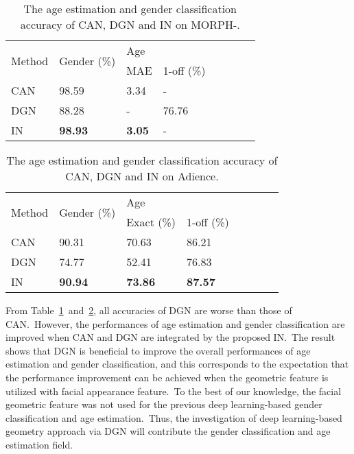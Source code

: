 \documentclass[10pt,twocolumn,letterpaper]{article}
\begin{document}
\begin{table}[!h]
\centering
\caption{The age estimation and gender classification accuracy of CAN, DGN and IN on MORPH-.}
\label{CAN,DGN,IN on MORPH}

\begin{adjustbox}{width=0.45\textwidth}
\begin{tabular}{p{3.8cm}lllllll}
\hline
\multirow{2}{*}{Method} & \multirow{2}{*}{Gender (\%)} & \multicolumn{2}{l}{Age} \\ \cline{3-4}
                        &        & MAE       & 1-off (\%)                        \\ \hline
CAN                     & 98.59      & 3.34            &    -                     \\
DGN                     & 88.28         & -            & 76.76                       \\
IN                      & \textbf{98.93}     & \textbf{3.05} & -                      \\ \hline
\end{tabular}
\end{adjustbox}
\end{table}


\begin{table}[!h]
\centering
\caption{The age estimation and gender classification accuracy of CAN, DGN and IN on Adience.}
\label{CAN,DGN,IN on Adience}

\begin{adjustbox}{width=0.45\textwidth}
\begin{tabular}{p{3.8cm}lllllll}
\hline
\multirow{2}{*}{Method} & \multirow{2}{*}{Gender (\%)} & \multicolumn{2}{l}{Age} \\ \cline{3-4}
                        &       & Exact (\%)     & 1-off (\%)                  \\ \hline
CAN                     &   90.31 &  70.63     &     86.21                     \\
DGN                     &    74.77 &  52.41         &   76.83                     \\
IN                      & \textbf{90.94}    &  \textbf{73.86}         & \textbf{87.57}                 \\ \hline
\end{tabular}
\end{adjustbox}
\end{table}

From Table~\ref{CAN,DGN,IN on MORPH}~and~\ref{CAN,DGN,IN on Adience}, all accuracies of DGN are worse than those of CAN.~However, the performances of age estimation and gender classification are improved when CAN and DGN are integrated by the proposed IN.~The result shows that DGN is beneficial to improve the overall performances of age estimation and gender classification, and this corresponds to the expectation that the performance improvement can be achieved when the geometric feature is utilized with facial appearance feature.~To the best of our knowledge, the facial geometric feature was not used for the previous deep learning-based gender classification and age estimation.~Thus, the investigation of deep learning-based geometry approach via DGN will contribute the gender classification and age estimation field.
\end{document}
